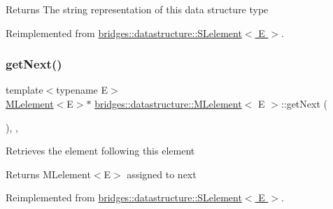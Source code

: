 \begin{DoxyReturn}{Returns}
The string representation of this data structure type 
\end{DoxyReturn}


Reimplemented from \hyperlink{classbridges_1_1datastructure_1_1_s_lelement_a602156aacacd73d1faa365d68d8af31b}{bridges\+::datastructure\+::\+S\+Lelement$<$ E $>$}.

\mbox{\label{classbridges_1_1datastructure_1_1_m_lelement_a47b417db0b948b6899eece572bef9274}} 
\subsubsection{\texorpdfstring{get\+Next()}{getNext()}\hspace{0.1cm}{\footnotesize\ttfamily [1/2]}}
{\footnotesize\ttfamily template$<$typename E$>$ \\
\hyperlink{classbridges_1_1datastructure_1_1_m_lelement}{M\+Lelement}$<$E$>$$\ast$ \hyperlink{classbridges_1_1datastructure_1_1_m_lelement}{bridges\+::datastructure\+::\+M\+Lelement}$<$ E $>$\+::get\+Next (\begin{DoxyParamCaption}{ }\end{DoxyParamCaption})\hspace{0.3cm}{\ttfamily [inline]}, {\ttfamily [override]}, {\ttfamily [virtual]}}

Retrieves the element following this element

\begin{DoxyReturn}{Returns}
M\+Lelement$<$\+E$>$ assigned to next 
\end{DoxyReturn}


Reimplemented from \hyperlink{classbridges_1_1datastructure_1_1_s_lelement_ae43dd771d9ced7cb17f1d35f34cd9a42}{bridges\+::datastructure\+::\+S\+Lelement$<$ E $>$}.

\mbox{\label{classbridges_1_1datastructure_1_1_m_lelement_a611b3e7d54fdfbc622004a50ca718e6e}} 
